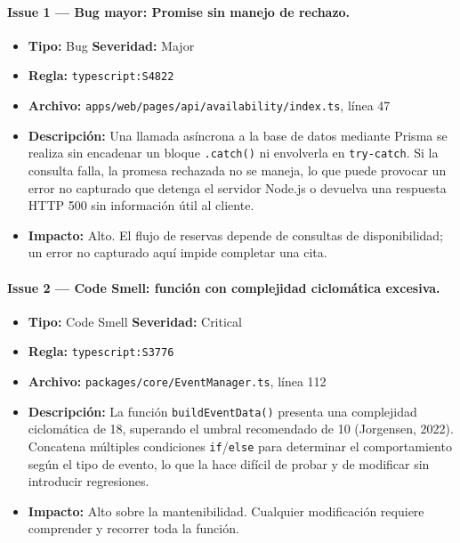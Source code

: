 \documentclass[12pt,letterpaper]{article}
\begin{document}
\paragraph{Issue 1 --- Bug mayor: Promise sin manejo de rechazo.}
\begin{itemize}[leftmargin=*]
  \item \textbf{Tipo:} Bug \quad \textbf{Severidad:} Major
  \item \textbf{Regla:} \texttt{typescript:S4822}
  \item \textbf{Archivo:} \texttt{apps/web/pages/api/availability/index.ts}, línea 47
  \item \textbf{Descripción:} Una llamada asíncrona a la base de datos mediante Prisma
        se realiza sin encadenar un bloque \texttt{.catch()} ni envolverla en
        \texttt{try-catch}. Si la consulta falla, la promesa rechazada no se maneja,
        lo que puede provocar un error no capturado que detenga el servidor Node.js
        o devuelva una respuesta HTTP 500 sin información útil al cliente.
  \item \textbf{Impacto:} Alto. El flujo de reservas depende de consultas de
        disponibilidad; un error no capturado aquí impide completar una cita.
\end{itemize}

\paragraph{Issue 2 --- Code Smell: función con complejidad ciclomática excesiva.}
\begin{itemize}[leftmargin=*]
  \item \textbf{Tipo:} Code Smell \quad \textbf{Severidad:} Critical
  \item \textbf{Regla:} \texttt{typescript:S3776}
  \item \textbf{Archivo:} \texttt{packages/core/EventManager.ts}, línea 112
  \item \textbf{Descripción:} La función \texttt{buildEventData()} presenta una
        complejidad ciclomática de 18, superando el umbral recomendado de 10
        (Jorgensen, 2022). Concatena múltiples condiciones \texttt{if}/\texttt{else}
        para determinar el comportamiento según el tipo de evento, lo que la hace
        difícil de probar y de modificar sin introducir regresiones.
  \item \textbf{Impacto:} Alto sobre la mantenibilidad. Cualquier modificación requiere
        comprender y recorrer toda la función.
\end{itemize}
\end{document}
